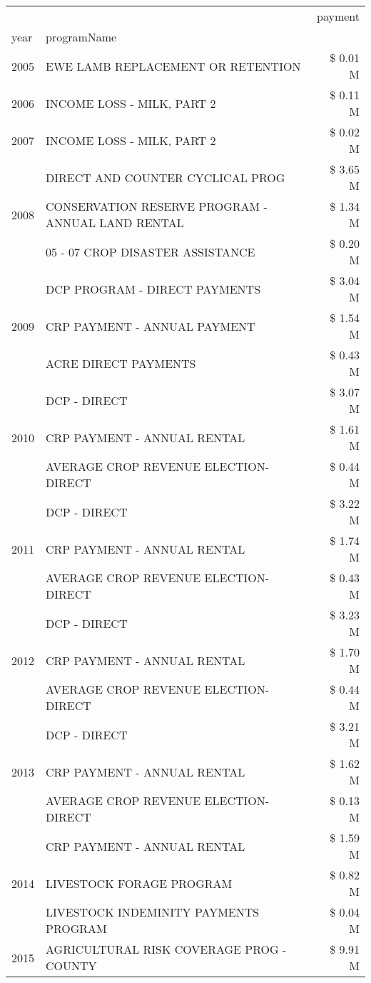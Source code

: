\begin{tabular}{llr}
\toprule
 &  & payment \\
year & programName &  \\
\midrule
2005 & EWE LAMB REPLACEMENT OR RETENTION & \$ 0.01 M \\
\cline{1-3}
2006 & INCOME LOSS - MILK, PART 2 & \$ 0.11 M \\
\cline{1-3}
2007 & INCOME LOSS - MILK, PART 2 & \$ 0.02 M \\
\cline{1-3}
\multirow[t]{3}{*}{2008} & DIRECT AND COUNTER CYCLICAL PROG & \$ 3.65 M \\
 & CONSERVATION RESERVE PROGRAM - ANNUAL LAND RENTAL & \$ 1.34 M \\
 & 05 - 07 CROP DISASTER ASSISTANCE & \$ 0.20 M \\
\cline{1-3}
\multirow[t]{3}{*}{2009} & DCP PROGRAM - DIRECT PAYMENTS & \$ 3.04 M \\
 & CRP PAYMENT - ANNUAL PAYMENT & \$ 1.54 M \\
 & ACRE DIRECT PAYMENTS & \$ 0.43 M \\
\cline{1-3}
\multirow[t]{3}{*}{2010} & DCP - DIRECT & \$ 3.07 M \\
 & CRP PAYMENT - ANNUAL RENTAL & \$ 1.61 M \\
 & AVERAGE CROP REVENUE ELECTION-DIRECT & \$ 0.44 M \\
\cline{1-3}
\multirow[t]{3}{*}{2011} & DCP - DIRECT & \$ 3.22 M \\
 & CRP PAYMENT - ANNUAL RENTAL & \$ 1.74 M \\
 & AVERAGE CROP REVENUE ELECTION-DIRECT & \$ 0.43 M \\
\cline{1-3}
\multirow[t]{3}{*}{2012} & DCP - DIRECT & \$ 3.23 M \\
 & CRP PAYMENT - ANNUAL RENTAL & \$ 1.70 M \\
 & AVERAGE CROP REVENUE ELECTION-DIRECT & \$ 0.44 M \\
\cline{1-3}
\multirow[t]{3}{*}{2013} & DCP - DIRECT & \$ 3.21 M \\
 & CRP PAYMENT - ANNUAL RENTAL & \$ 1.62 M \\
 & AVERAGE CROP REVENUE ELECTION-DIRECT & \$ 0.13 M \\
\cline{1-3}
\multirow[t]{3}{*}{2014} & CRP PAYMENT - ANNUAL RENTAL & \$ 1.59 M \\
 & LIVESTOCK FORAGE PROGRAM & \$ 0.82 M \\
 & LIVESTOCK INDEMINITY PAYMENTS PROGRAM & \$ 0.04 M \\
\cline{1-3}
\multirow[t]{3}{*}{2015} & AGRICULTURAL RISK COVERAGE PROG - COUNTY & \$ 9.91 M \\

\end{tabular}
